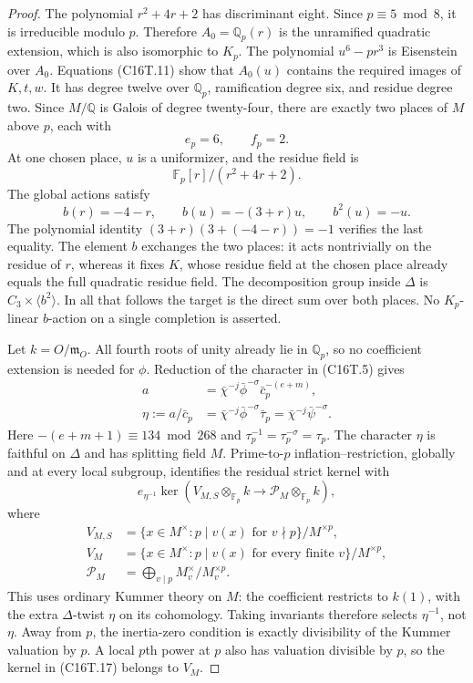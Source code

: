 \begin{proof}
The polynomial $r^2+4r+2$ has discriminant eight.
Since $p\equiv5\bmod8$, it is irreducible modulo $p$.
Therefore $A_0=\mathbb Q_p(r)$ is the unramified quadratic
extension, which is also isomorphic to $K_p$.
The polynomial $u^6-pr^3$ is Eisenstein over $A_0$.
Equations (C16T.11) show that
$A_0(u)$ contains the required images of $K,t,w$.
It has degree twelve over $\mathbb Q_p$, ramification degree six,
and residue degree two.
Since $M/\mathbb Q$ is Galois of degree twenty-four, there are
exactly two places of $M$ above $p$, each with
\[
                             e_p=6,\qquad f_p=2.
 \tag{C16T.13}
\]
At one chosen place, $u$ is a uniformizer, and the residue field is
\[
                         \mathbb F_p[r]/(r^2+4r+2).
 \tag{C16T.14}
\]
The global actions satisfy
\[
 b(r)=-4-r,\qquad b(u)=-(3+r)u,\qquad b^2(u)=-u.
 \tag{C16T.15}
\]
The polynomial identity
$(3+r)(3+(-4-r))=-1$ verifies the last equality.
The element $b$ exchanges the two places: it acts nontrivially
on the residue of $r$, whereas it fixes $K$, whose residue field
at the chosen place already equals the full quadratic residue field.
The decomposition group inside $\Delta$ is
$C_3\times\langle b^2\rangle$.
In all that follows the target is the direct sum over both places.
No $K_p$-linear $b$-action on a single completion is asserted.

Let $k=O/\mathfrak m_O$.  All fourth roots of unity already lie
in $\mathbb Q_p$, so no coefficient extension is needed for $\phi$.
Reduction of the character in (C16T.5) gives
\[
 \begin{aligned}
 a&=\bar\chi^{-j}\bar\phi^{-\sigma}\bar c_p^{-(e+m)},\\
 \eta:=a/\bar c_p
   &=\bar\chi^{-j}\bar\phi^{-\sigma}\bar\tau_p
     =\bar\chi^{-j}\bar\psi^{-\sigma}.
 \end{aligned}
 \tag{C16T.16}
\]
Here $-(e+m+1)\equiv134\bmod268$ and
$\tau_p^{-1}=\tau_p^{-\sigma}=\tau_p$.
The character $\eta$ is faithful on $\Delta$ and has splitting
field $M$.  Prime-to-$p$ inflation--restriction, globally and
at every local subgroup, identifies the residual strict kernel with
\[
 e_{\eta^{-1}}\ker\left(
       V_{M,S}\otimes_{\mathbb F_p}k
           \longrightarrow\mathcal P_M\otimes_{\mathbb F_p}k\right),
 \tag{C16T.17}
\]
where
\[
 \begin{aligned}
 V_{M,S}&=\{x\in M^\times:p\mid v(x)\text{ for }v\nmid p\}/M^{\times p},\\
 V_M&=\{x\in M^\times:p\mid v(x)\text{ for every finite }v\}/M^{\times p},\\
 \mathcal P_M&=\bigoplus_{v\mid p}M_v^\times/M_v^{\times p}.
 \end{aligned}
 \tag{C16T.18}
\]
This uses ordinary Kummer theory on $M$: the coefficient restricts
to $k(1)$, with the extra $\Delta$-twist $\eta$ on its cohomology.
Taking invariants therefore selects $\eta^{-1}$, not $\eta$.
Away from $p$, the inertia-zero condition is exactly divisibility
of the Kummer valuation by $p$.  A local $p$th power at $p$ also
has valuation divisible by $p$, so the kernel in (C16T.17)
belongs to $V_M$.


\end{proof}
